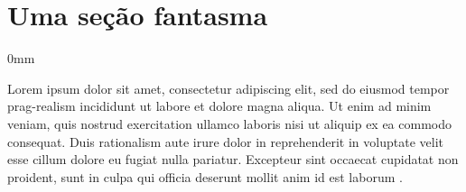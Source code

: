 \documentclass[./main.tex]{subfiles}
\begin{document}
\section*{Uma seção fantasma}
{}
\label{sec_i}

\begin{adjustwidth}{\bodytab}{0mm}

\par Lorem ipsum dolor sit amet, consectetur adipiscing elit, sed do eiusmod tempor \gls{prag-realism} incididunt ut labore et dolore magna aliqua. Ut enim ad minim veniam, quis nostrud exercitation ullamco laboris nisi ut aliquip ex ea commodo consequat. Duis \gls{rationalism} aute irure dolor in reprehenderit in voluptate velit esse cillum dolore eu fugiat nulla pariatur. Excepteur sint occaecat cupidatat non proident, sunt in culpa qui officia deserunt mollit anim id est laborum \cite{Pearce2002a}.

\end{adjustwidth}

\clearpage
\end{document}
